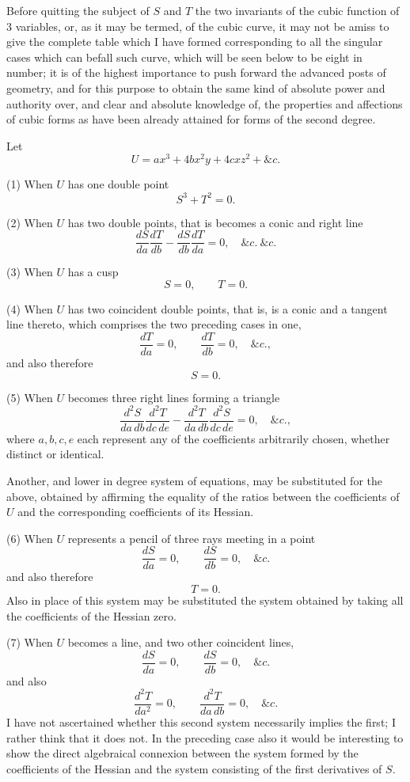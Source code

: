 \documentclass[11pt]{article}
\newcommand{\sourcepage}[1]{\marginpar{\scriptsize p.~#1}}
\begin{document}
{{\sourcepage{335}
Before quitting the subject of $S$ and $T$ the two invariants of the cubic function of 3 variables, or, as it may be termed, of the cubic curve, it may not be amiss to give the complete table which I have formed corresponding to all the singular cases which can befall such curve, which will be seen below to be eight in number; it is of the highest importance to push forward the advanced posts of geometry, and for this purpose to obtain the same kind of absolute power and authority over, and clear and absolute knowledge of, the properties and affections of cubic forms as have been already attained for forms of the second degree.

Let
\[
U=ax^3+4bx^2y+4cxz^2+\&c.
\]

(1) When $U$ has one double point
\[
S^3+T^2=0.
\]

(2) When $U$ has two double points, that is becomes a conic and right line
\[
\frac{dS}{da}\frac{dT}{db}-\frac{dS}{db}\frac{dT}{da}=0,\quad \&c.\ \&c.
\]

(3) When $U$ has a cusp
\[
S=0,\qquad T=0.
\]

(4) When $U$ has two coincident double points, that is, is a conic and a tangent line thereto, which comprises the two preceding cases in one,
\[
\frac{dT}{da}=0,\qquad \frac{dT}{db}=0,\quad \&c.,
\]
and also therefore
\[
S=0.
\]

(5) When $U$ becomes three right lines forming a triangle
\[
\frac{d^2S}{da\,db}\frac{d^2T}{dc\,de}
-\frac{d^2T}{da\,db}\frac{d^2S}{dc\,de}=0,\quad \&c.,
\]
where $a,b,c,e$ each represent any of the coefficients arbitrarily chosen, whether distinct or identical.

Another, and lower in degree system of equations, may be substituted for the above, obtained by affirming the equality of the ratios between the coefficients of $U$ and the corresponding coefficients of its Hessian.

(6) When $U$ represents a pencil of three rays meeting in a point
\[
\frac{dS}{da}=0,\qquad \frac{dS}{db}=0,\quad \&c.
\]
and also therefore
\[
T=0.
\]
Also in place of this system may be substituted the system obtained by taking all the coefficients of the Hessian zero.

\sourcepage{336}
(7) When $U$ becomes a line, and two other coincident lines,
\[
\frac{dS}{da}=0,\qquad \frac{dS}{db}=0,\quad \&c.
\]
and also
\[
\frac{d^2T}{da^2}=0,\qquad \frac{d^2T}{da\,db}=0,\quad \&c.
\]
I have not ascertained whether this second system necessarily implies the first; I rather think that it does not. In the preceding case also it would be interesting to show the direct algebraical connexion between the system formed by the coefficients of the Hessian and the system consisting of the first derivatives of $S$.

}}
\end{document}
